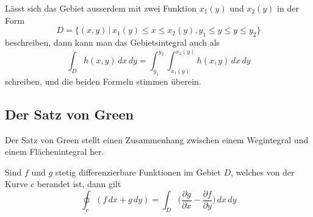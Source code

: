 Lässt sich das Gebiet ausserdem mit zwei Funktion $x_1(y)$ und $x_2(y)$
in der Form
\[
D=\{(x,y)\,|\, x_1(y)\le x\le x_2(y), y_1\le y\le y\le y_2\}
\]
beschreiben, dann kann man das Gebietsintegral auch als
\[
\int_Dh(x,y)\,dx\,dy
=
\int_{y_1}^{y_2}\int_{x_1(y)}^{x_2(y)} h(x,y)\,dx\,dy
\]
schreiben, und die beiden Formeln stimmen überein.

\subsection{Der Satz von Green%
\label{skript:kruemmung:section:green}}
Der Satz von Green stellt einen Zusammenhang zwischen einem Wegintegral
und einem Flächenintegral her.

\begin{satz}[Green]
\label{skript:kruemmung:satz:green}
Sind $f$ und $g$ stetig differenzierbare Funktionen im Gebiet $D$, welches
von der Kurve $c$ berandet ist, dann gilt
\[
\oint_c (f\,dx + g\,dy)
=
\int_D \biggl(\frac{\partial g}{\partial x}
   -\frac{\partial f}{\partial y}\biggr)\,dx\,dy
\]
\end{satz}
%

